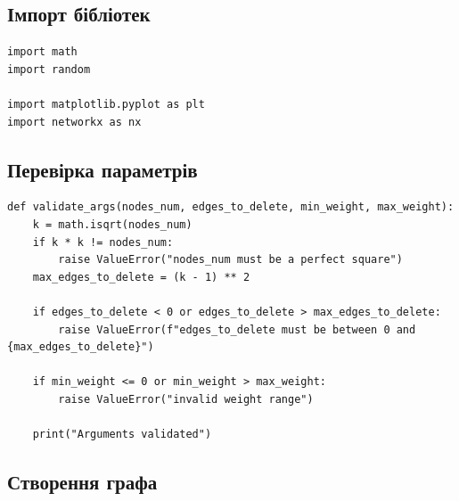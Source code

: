 \documentclass[12pt,a4paper]{article}
\begin{document}
\subsection{Імпорт бібліотек}

\begin{listing}[H]
\begin{verbatim}
import math
import random

import matplotlib.pyplot as plt
import networkx as nx
\end{verbatim}
\caption{Імпорт використаних бібліотек}
\end{listing}

\subsection{Перевірка параметрів}

\begin{listing}[H]
\begin{verbatim}
def validate_args(nodes_num, edges_to_delete, min_weight, max_weight):
    k = math.isqrt(nodes_num)
    if k * k != nodes_num:
        raise ValueError("nodes_num must be a perfect square")
    max_edges_to_delete = (k - 1) ** 2

    if edges_to_delete < 0 or edges_to_delete > max_edges_to_delete:
        raise ValueError(f"edges_to_delete must be between 0 and {max_edges_to_delete}")

    if min_weight <= 0 or min_weight > max_weight:
        raise ValueError("invalid weight range")

    print("Arguments validated")
\end{verbatim}
\caption{Функція перевірки вхідних параметрів}
\end{listing}

\subsection{Створення графа}
\end{document}
